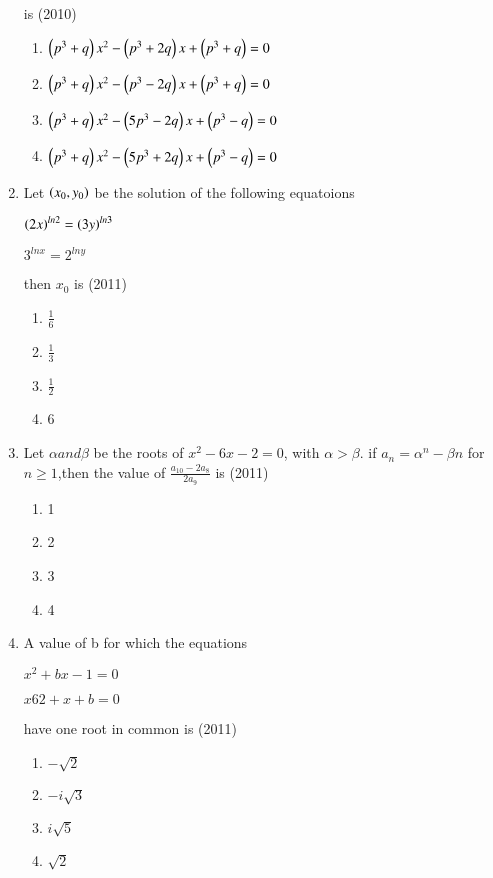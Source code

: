 \documentclass[journal,12pt,twocolumn]{IEEEtran}
\theoremstyle{remark}
\begin{document}
\begin{enumerate}[start=31]
is \hfill (2010)
\begin{enumerate}
    \item $\left(p^{3}+q\right)x^{2}-\left(p^{3}+2q\right)x+\left(p^{3}+q\right)=0$
    \item $\left(p^{3}+q\right)x^{2}-\left(p^{3}-2q\right)x+\left(p^{3}+q\right)=0$
    \item $\left(p^{3}+q\right)x^{2}-\left(5p^{3}-2q\right)x+\left(p^{3}-q\right)=0$
    \item $\left(p^{3}+q\right)x^{2}-\left(5p^{3}+2q\right)x+\left(p^{3}-q\right)=0$
\end{enumerate}
\item Let $\left(x_0,y_0\right)$ be the solution of the following equatoions

$\left(2x\right)^{ln2}=\left(3y\right)^{ln3}$

$3^{lnx}=2^{lny}$

then $x_{0}$ is \hfill (2011)
\begin{multicols}{4}
\begin{enumerate}
    \item $\frac{1}{6}$
    \item $\frac{1}{3}$
    \item $\frac{1}{2}$
    \item 6
\end{enumerate}
    
\end{multicols}
\item Let $\alpha and \beta$ be the roots of $x^{2}-6x-2=0$, with $\alpha>\beta$. if $a_{n}=\alpha^{n}-\beta{n}$ for $n\geq 1$,then the value of $\frac{a_{10}-2a_{8}}{2a_{9}}$ is \hfill (2011)
\begin{multicols}{4}
\begin{enumerate}
    \item 1
    \item 2
    \item 3
    \item 4    
\end{enumerate}
    
\end{multicols}
\item A value of b for which the equations 

$x^{2}+bx-1=0$

$x6{2}+x+b=0$

have one root in common is \hfill (2011)
\begin{multicols}{2}
\begin{enumerate}
    \item $-\sqrt{2}$
    \item $-i\sqrt{3}$
    \item $i\sqrt{5}$
    \item $\sqrt{2}$
\end{enumerate}
    

\end{multicols}
\end{enumerate}
\end{document}
